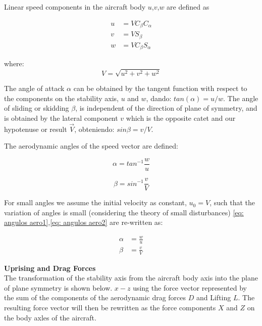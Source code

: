 Linear speed components in the aircraft body $u$,$v$,$w$ are defined as

\begin{align}
\label{eq cossin V}
u &= V C_{\beta} C_{\alpha}\\
v &= V S_{\beta}\\
w &= V C_{\beta} S_{\alpha}
\end{align}

where:
\begin{equation}
    V = \sqrt{u^2 + v^2 + w^2}
\end{equation}

The angle of attack $\alpha$ can be obtained by the tangent function with respect to the components on the stability axis, $u$ and $w$, dando: $tan{(\alpha)}=u/w$. The angle of sliding or skidding $\beta$, is independent of the direction of plane of symmetry, and is obtained by the lateral component $v$ which is the opposite catet and our hypotenuse or result $\Vec{V}$, obteniendo: $sin{\beta}=v/V$.

The aerodynamic angles of the speed vector are defined:

\begin{equation}
\label{eq: angulos aero1}
  \alpha = tan^{-1} \frac{w}{u}  
\end{equation}

\begin{equation}
\label{eq: angulos aero2}
  \beta = sin^{-1} \frac{v}{V}
\end{equation}

\medskip

For small angles we assume the initial velocity as constant, $u_0 = V$, such that the variation of angles is small (considering the theory of small disturbances) \ref{eq: angulos aero1},\ref{eq: angulos aero2} are re-written as: 

\begin{align}
\label{eq: ángulos aerodinámicos con pequeñas perturbaciones}
\alpha &= \frac{w}{u}\\
\beta &= \frac{v}{V}
\end{align}

\medskip
\textbf{Uprising and Drag Forces}\\
The transformation of the stability axis from the aircraft body axis into the plane of plane symmetry is shown below. $x-z$ using the force vector represented by the sum of the components of the aerodynamic drag forces $D$ and Lifting $L$. The resulting force vector will then be rewritten as the force components $X$ and $Z$ on the body axles of the aircraft.  

